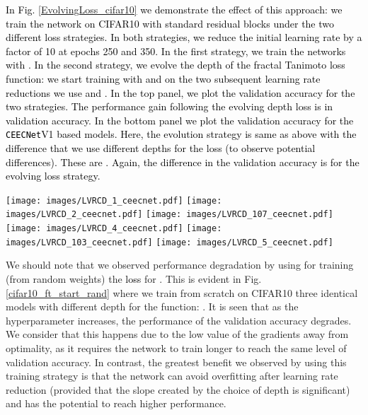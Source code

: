 \documentclass[times, 5p]{elsarticle}
\def \FracTAL {\texttt{FracTAL} }
\newcommand{\ceecnet}{\texttt{CEECNet}}
\newcommand{\mantis}{\texttt{mantis}}
\begin{document}
\textcolor{black}{
In Fig. \ref{EvolvingLoss_cifar10} we demonstrate the effect of this approach: we train the network on \textsc{CIFAR10} with standard residual blocks \citep[top panel][]{DBLP:journals/corr/HeZR016,DBLP:journals/corr/HeZRS15} under the two different loss strategies. In both strategies, we reduce the initial  learning rate by a factor of 10 at epochs 250 and 350. In the first strategy, we train the networks with . In the second strategy, we evolve the depth of the fractal Tanimoto  loss function: we start training with    and on the two subsequent learning rate reductions we use  and .  In the top panel, we plot the validation accuracy for the two strategies. The performance gain following the evolving depth loss is  in validation accuracy.   
In the bottom panel we plot the validation accuracy for the \ceecnet{}V1  based models. Here, the evolution strategy is same as above with the difference that  we use different depths for the  loss (to observe potential differences). These are . Again, the difference in the validation accuracy is  for the evolving loss strategy. }



\begin{figure*}
\centering
\texttt{[image: images/LVRCD\_1\_ceecnet.pdf]}
\texttt{[image: images/LVRCD\_2\_ceecnet.pdf]}
\texttt{[image: images/LVRCD\_107\_ceecnet.pdf]}
\texttt{[image: images/LVRCD\_4\_ceecnet.pdf]}
\texttt{[image: images/LVRCD\_103\_ceecnet.pdf]}
\texttt{[image: images/LVRCD\_5\_ceecnet.pdf]}
\caption{Examples of inferred change detection on some test tiles from the LEVIRCD dataset of the \mantis{} \ceecnet V1 model \textcolor{black}{(evolving loss strategy, \FracTAL depth )}. For each row, from left to right input image date 1, input image date 2, ground truth,  change prediction (threshold 0.5) and confidence heat map.} 
\label{LEVIRCD_show}
\end{figure*}


We should note that we observed performance degradation by using for training (from random weights) the  \textcolor{black}{loss} for . This is evident in Fig. \ref{cifar10_ft_start_rand} where we train from scratch on CIFAR10 three identical models with different depth for the  function: . It is seen that as the hyperparameter  increases, the performance of the validation accuracy degrades. 
  We consider that this happens due to the low value of the gradients away from optimality, as it requires the network to train longer to reach the same level of validation accuracy. In contrast, the greatest benefit we observed by using this training strategy is that the network can avoid overfitting after learning rate reduction (provided that the slope created by the choice of depth  is significant) and has the potential to reach higher performance. 
\end{document}
